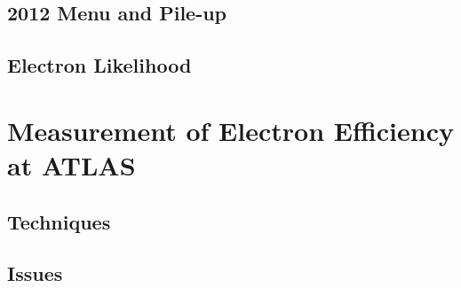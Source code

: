 \subsection{2012 Menu and Pile-up}



\subsection{Electron Likelihood}


\section{Measurement of Electron Efficiency at ATLAS}


\subsection{Techniques}

\subsection{Issues}

